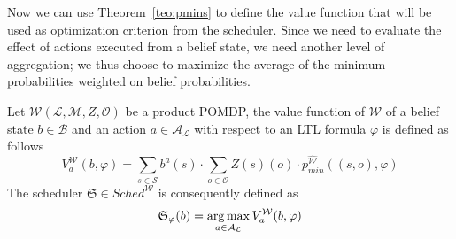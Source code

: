 %
%

Now we can use 
Theorem~\ref{teo:pmins} to define the value function that will be used as optimization criterion from the scheduler. Since we need to evaluate the effect of actions executed from a belief state, we need another level of aggregation; we thus choose to maximize the average of the minimum probabilities weighted on belief probabilities.

\begin{definition}
Let $\mathcal{W}(\mathcal{L},\mathcal{M},Z,\mathcal{O})$ be a product \ac{POMDP}, the value function of $\mathcal{W}$ of a belief state $b\in\mathcal{B}$ and an action $a\in\mathcal{A}_\mathcal{L}$ with respect to an \ac{LTL} formula $\varphi$ is defined as follows
$$ V_a^\mathcal{W}(b,\varphi)= \sum_{s\in\mathcal{S}} b^a(s)\cdot \sum_{o\in\mathcal{O}} Z(s)(o)\cdot p_{min}^{\widehat{\mathcal{W}}}((s,o),\varphi) $$
The scheduler $\mathfrak{S} \in Sched^\mathcal{W}$ is consequently defined as
$$ \mathfrak{S}_\varphi(b) = \operatorname*{arg\,max}_{a\in\mathcal{A}_\mathcal{L}} V_a^\mathcal{W}(b,\varphi) $$
\end{definition}





